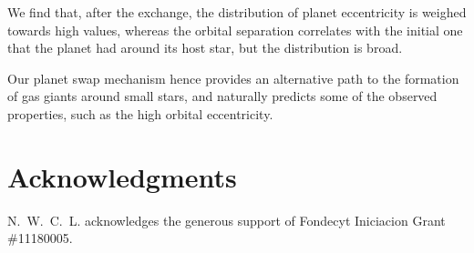 \documentclass[twocolumn]{aastex62}
\begin{document}
We find that, after the exchange, the
distribution of planet eccentricity is weighed towards high values, whereas the
  orbital separation  correlates with the initial one that the planet had around its host star, but the distribution is broad.
  
  
  Our planet swap mechanism hence provides an alternative path to the formation of gas giants around small stars, and naturally predicts some of the observed properties, such as the high orbital eccentricity.


\section*{Acknowledgments}

N.~W.~C.~L. acknowledges the generous support of Fondecyt Iniciacion Grant \#11180005. 








\end{document}
